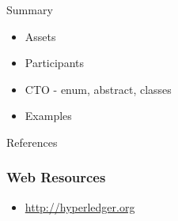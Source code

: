 \documentclass[pdf,table]{beamer}
\begin{document}
\begin{frame}{Summary}
	\begin{itemize}
		\item Assets
		\item Participants
		\item CTO - enum, abstract, classes
		\item Examples
	\end{itemize}
\end{frame}


\begin{frame}[allowframebreaks]{References}
	\printbibliography
\end{frame}
	
\begin{frame}
	\frametitle{Web Resources}
	\begin{itemize}
	\item \url{http://hyperledger.org}
	\end{itemize}
\end{frame}
\end{document}
